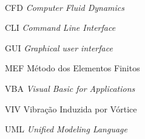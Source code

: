 

\imprimirfolhaderosto\

% 











\listoffigures*
\cleardoublepage

\listoftables*
\cleardoublepage

\begin{siglas}
  \item[CFD] \textit{Computer Fluid Dynamics}
  \item[CLI] \textit{Command Line Interface}
  \item[GUI] \textit{Graphical user interface}
  \item[MEF] Método dos Elementos Finitos
  \item[VBA] \textit{Visual Basic for Applications}
  \item[VIV] Vibração Induzida por Vórtice
  \item[UML] \textit{Unified Modeling Language}
\end{siglas}


\tableofcontents*
\cleardoublepage